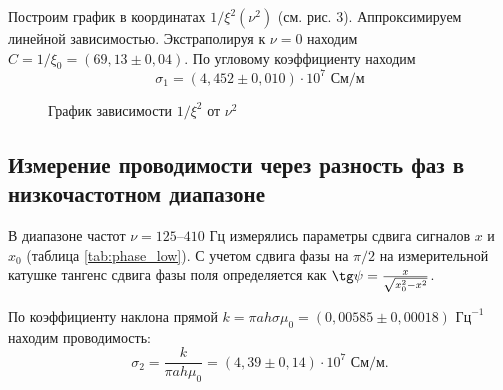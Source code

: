 \documentclass[12pt]{extarticle}
\begin{document}
	Построим график в координатах $1/\xi^2(\nu^2)$ (см. рис. 3). Аппроксимируем линейной зависимостью. Экстраполируя к $\nu = 0$ находим $C = 1/\xi_0 = (69,13 \pm 0,04)$. По угловому коэффициенту находим 
	\[
	\sigma_1 = (4,452 \pm 0,010)\cdot 10^7\text{ См/м}
	\]
	\begin{figure}[H]
		\centering
		\caption{График зависимости $1/\xi^2$ от $\nu^2$}
		\label{fig:amp_low}
	\end{figure}
	

	
	\subsection{Измерение проводимости через разность фаз в низкочастотном диапазоне}
	
	В диапазоне частот $\nu = 125\text{--}410\text{ Гц}$  измерялись параметры сдвига сигналов $x$ и $x_0$ (таблица \ref{tab:phase_low}). С учетом сдвига фазы на $\pi/2$ на измерительной катушке тангенс сдвига фазы поля определяется как $\tg\psi = \frac{x}{\sqrt{x_0^2 - x^2}}$.
	
	По коэффициенту наклона прямой $k = \pi a h \sigma \mu_0 = (0,00585 \pm 0,00018)\text{ Гц}^{-1}$ находим проводимость:
	\[
	\sigma_2 = \frac{k}{\pi a h \mu_0} = (4,39 \pm 0,14)\cdot 10^7\text{ См/м}.
	\]
	
\end{document}
